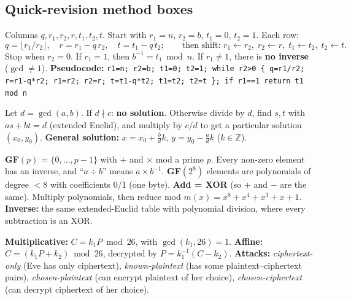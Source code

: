 \subsection{Quick-revision method boxes}

\begin{keybox}[title={Extended Euclidean algorithm (Forouzan table): inverse of $b$ mod $n$}]
Columns $q, r_1, r_2, r, t_1, t_2, t$. Start with $r_1 = n$, $r_2 = b$, $t_1 = 0$, $t_2 = 1$. Each row:
\[
q = \lfloor r_1 / r_2 \rfloor,\quad r = r_1 - q\,r_2,\quad t = t_1 - q\,t_2;\qquad\text{then shift: } r_1 \leftarrow r_2,\; r_2 \leftarrow r,\; t_1 \leftarrow t_2,\; t_2 \leftarrow t.
\]
Stop when $r_2 = 0$. If $r_1 = 1$, then $b^{-1} = t_1 \bmod n$. If $r_1 \ne 1$, there is \textbf{no inverse} ($\gcd \ne 1$).
\textbf{Pseudocode:}
\texttt{r1=n; r2=b; t1=0; t2=1; while r2>0 \{ q=r1/r2; r=r1-q*r2; r1=r2; r2=r; t=t1-q*t2; t1=t2; t2=t \}; if r1==1 return t1 mod n}
\end{keybox}

\begin{keybox}[title={Linear Diophantine equation $ax + by = c$}]
Let $d = \gcd(a, b)$. If $d \nmid c$: \textbf{no solution}. Otherwise divide by $d$, find $s, t$ with $as + bt = d$ (extended Euclid), and multiply by $c/d$ to get a particular solution $(x_0, y_0)$.
\textbf{General solution:} $x = x_0 + \frac{b}{d}k$, \; $y = y_0 - \frac{a}{d}k$ \; ($k \in \mathbb{Z}$).
\end{keybox}

\begin{keybox}[title={GF$(p)$ and GF$(2^8)$}]
\textbf{GF$(p)$} = $\{0, \dots, p-1\}$ with $+$ and $\times$ mod a prime $p$. Every non-zero element has an inverse, and ``$a \div b$'' means $a \times b^{-1}$.
\textbf{GF$(2^8)$} elements are polynomials of degree $<8$ with coefficients 0/1 (one byte). \textbf{Add = XOR} (so $+$ and $-$ are the same). Multiply polynomials, then reduce mod $m(x) = x^8 + x^4 + x^3 + x + 1$.
\textbf{Inverse:} the same extended-Euclid table with polynomial division, where every subtraction is an XOR.
\end{keybox}

\begin{keybox}[title=Two classical ciphers and the attack types]
\textbf{Multiplicative:} $C = k_1 P \bmod 26$, with $\gcd(k_1, 26) = 1$. \textbf{Affine:} $C = (k_1 P + k_2) \bmod 26$, decrypted by $P = k_1^{-1}(C - k_2)$.
\textbf{Attacks:} \emph{ciphertext-only} (Eve has only ciphertext), \emph{known-plaintext} (has some plaintext--ciphertext pairs), \emph{chosen-plaintext} (can encrypt plaintext of her choice), \emph{chosen-ciphertext} (can decrypt ciphertext of her choice).
\end{keybox}


